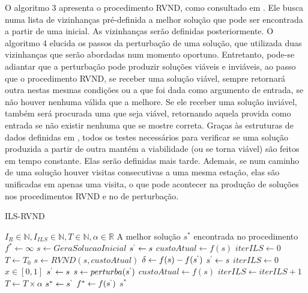 \par O algoritmo 3 apresenta o procedimento RVND, como consultado em \citet{art:REF_ART_7}. Ele busca numa lista de vizinhanças pré-definida a melhor solução que pode ser encontrada a partir de uma inicial. As vizinhanças serão definidas posteriormente. O algoritmo 4 elucida os passos da perturbação de uma solução, que utilizada duas vizinhanças que serão abordadas num momento oportuno. Entretanto, pode-se adiantar que a perturbação pode produzir soluções viáveis e inviáveis, ao passo que o procedimento RVND, se receber uma solução viável, sempre retornará outra nestas mesmas condições ou a que foi dada como argumento de entrada, se não houver nenhuma válida que a melhore. Se ele receber uma solução inviável, também será procurada uma que seja viável, retornando aquela provida como entrada se não existir nenhuma que se mostre correta. Graças às estruturas de dados definidas em \citet{art:REF_ART_4}, todos os testes necessários para verificar se uma solução produzida a partir de outra mantém a viabilidade (ou se torna viável) são feitos em tempo constante. Elas serão definidas mais tarde. Ademais, se num caminho de uma solução houver visitas consecutivas a uma mesma estação, elas são unificadas em apenas uma visita, o que pode acontecer na produção de soluções nos procedimentos RVND e no de perturbação.

    \begin{algorithm}[H]
    \caption{ILS-RVND}
    \begin{algorithmic}[1]
    \REQUIRE $I_R \in \mathbb{N}, I_{ILS} \in \mathbb{N}, T \in \mathbb{N}, \alpha \in \mathbb{R}$
    \ENSURE A melhor solução $s^*$ encontrada no procedimento
    \STATE $f^* \leftarrow \infty$
        \STATE $s \leftarrow GeraSolucaoInicial$
        \STATE $s^\lq \leftarrow s$
        \STATE $custoAtual \leftarrow f(s)$
        \STATE $iterILS \leftarrow 0$
        \STATE $T \leftarrow T_0$
            \STATE $s \leftarrow RVND(s, custoAtual)$
            \STATE $\delta \leftarrow f(s) - f(s^\lq)$
                \STATE $s^\lq \leftarrow s$
                \STATE $iterILS \leftarrow 0$
            \ELSE
                \STATE $x \in [0, 1]$
                    \STATE $s^\lq \leftarrow s$
                \ENDIF
            \ENDIF
            \STATE $s \leftarrow perturba(s^\lq)$
            \STATE $custoAtual \leftarrow f(s)$
            \STATE $iterILS \leftarrow iterILS + 1$
            \STATE $T \leftarrow T \times \alpha$
        \ENDWHILE
            \STATE $s^* \leftarrow s^\lq$
            \STATE $f^* \leftarrow f(s^\lq)$
        \ENDIF
    \ENDFOR
    \RETURN $s^*$
    \end{algorithmic}
    \end{algorithm}
    
